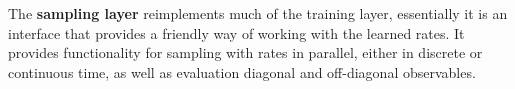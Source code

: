 The \textbf{sampling layer} reimplements much of the training layer, essentially it is an interface that provides a friendly way of working with the learned rates. It provides functionality for sampling with rates in parallel, either in discrete or continuous time, as well as evaluation diagonal and off-diagonal observables. 









